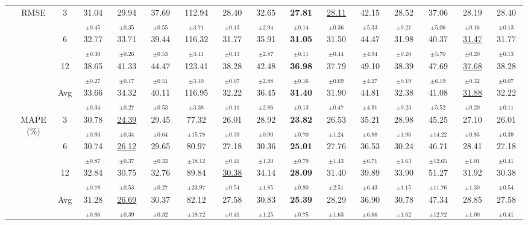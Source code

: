 \begin{table}[t]
{\begin{tabular}{ccc|ccc|cccc|cccc|cc}
\cmidrule(lr){2-16}
 & \multirow{4}{*}{RMSE} & 3 & 31.04$_{\pm0.45}$ & 29.94$_{\pm0.35}$ & 37.69$_{\pm0.55}$ & 112.94$_{\pm3.71}$ & 28.40$_{\pm0.13}$ & 32.65$_{\pm2.94}$ & \textbf{27.81$_{\pm0.14}$} & \underline{28.11$_{\pm0.36}$} & 42.15$_{\pm5.33}$ & 28.52$_{\pm0.27}$ & 37.06$_{\pm5.06}$ & 28.19$_{\pm0.16}$ & 28.40$_{\pm0.13}$ \\
 &  & 6 & 32.77$_{\pm0.30}$ & 33.71$_{\pm0.26}$ & 39.44$_{\pm0.53}$ & 116.32$_{\pm3.41}$ & 31.77$_{\pm0.13}$ & 35.91$_{\pm2.87}$ & \textbf{31.05$_{\pm0.11}$} & 31.50$_{\pm0.44}$ & 44.47$_{\pm4.94}$ & 31.98$_{\pm0.20}$ & 40.37$_{\pm5.70}$ & \underline{31.47$_{\pm0.20}$} & 31.77$_{\pm0.13}$ \\
 &  & 12 & 38.65$_{\pm0.27}$ & 41.33$_{\pm0.17}$ & 44.47$_{\pm0.51}$ & 123.41$_{\pm3.10}$ & 38.28$_{\pm0.07}$ & 42.48$_{\pm2.88}$ & \textbf{36.98$_{\pm0.16}$} & 37.79$_{\pm0.69}$ & 49.10$_{\pm4.27}$ & 38.39$_{\pm0.19}$ & 47.69$_{\pm6.19}$ & \underline{37.68$_{\pm0.32}$} & 38.28$_{\pm0.07}$ \\
 &  & Avg & 33.66$_{\pm0.34}$ & 34.32$_{\pm0.27}$ & 40.11$_{\pm0.53}$ & 116.95$_{\pm3.38}$ & 32.22$_{\pm0.11}$ & 36.45$_{\pm2.86}$ & \textbf{31.40$_{\pm0.13}$} & 31.90$_{\pm0.47}$ & 44.81$_{\pm4.91}$ & 32.38$_{\pm0.23}$ & 41.08$_{\pm5.52}$ & \underline{31.88$_{\pm0.20}$} & 32.22$_{\pm0.11}$ \\
\cmidrule(lr){2-16}
 & \multirow{4}{*}{MAPE (\%)} & 3 & 30.78$_{\pm0.93}$ & \underline{24.39$_{\pm0.34}$} & 29.45$_{\pm0.64}$ & 77.32$_{\pm15.78}$ & 26.01$_{\pm0.39}$ & 28.92$_{\pm0.90}$ & \textbf{23.82$_{\pm0.70}$} & 26.53$_{\pm1.24}$ & 35.21$_{\pm6.88}$ & 28.98$_{\pm1.96}$ & 45.25$_{\pm14.22}$ & 27.10$_{\pm0.83}$ & 26.01$_{\pm0.39}$ \\
 &  & 6 & 30.74$_{\pm0.87}$ & \underline{26.12$_{\pm0.37}$} & 29.65$_{\pm0.33}$ & 80.97$_{\pm18.12}$ & 27.18$_{\pm0.41}$ & 30.36$_{\pm1.20}$ & \textbf{25.01$_{\pm0.79}$} & 27.76$_{\pm1.43}$ & 36.53$_{\pm6.71}$ & 30.24$_{\pm1.63}$ & 46.71$_{\pm12.65}$ & 28.41$_{\pm1.01}$ & 27.18$_{\pm0.41}$ \\
 &  & 12 & 32.84$_{\pm0.78}$ & 30.75$_{\pm0.53}$ & 32.76$_{\pm0.27}$ & 89.84$_{\pm23.97}$ & \underline{30.38$_{\pm0.54}$} & 34.14$_{\pm1.85}$ & \textbf{28.09$_{\pm0.80}$} & 31.40$_{\pm2.51}$ & 39.89$_{\pm6.43}$ & 33.90$_{\pm1.15}$ & 51.27$_{\pm11.76}$ & 31.92$_{\pm1.30}$ & 30.38$_{\pm0.54}$ \\
 &  & Avg & 31.28$_{\pm0.86}$ & \underline{26.69$_{\pm0.39}$} & 30.37$_{\pm0.32}$ & 82.12$_{\pm18.72}$ & 27.58$_{\pm0.41}$ & 30.83$_{\pm1.25}$ & \textbf{25.39$_{\pm0.75}$} & 28.29$_{\pm1.63}$ & 36.90$_{\pm6.66}$ & 30.78$_{\pm1.62}$ & 47.34$_{\pm12.72}$ & 28.85$_{\pm1.00}$ & 27.58$_{\pm0.41}$ \\

\end{tabular}}
\end{table}
